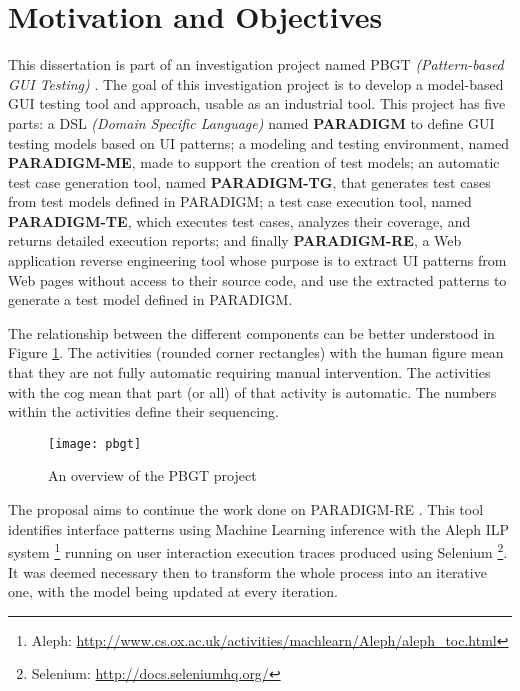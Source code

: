 \section{Motivation and Objectives} \label{sec:goals}

This dissertation is part of an investigation project named PBGT \textit{(Pattern-based GUI Testing)} \cite{moreira2013pattern}. The goal of this investigation project is to develop a model-based GUI testing tool and approach, usable as an industrial tool. This project has five parts: a DSL \textit{(Domain Specific Language)} named \textbf{PARADIGM} to define GUI testing models based on UI patterns; a modeling and testing environment, named \textbf{PARADIGM-ME}, made to support the creation of test models; an automatic test case generation tool, named \textbf{PARADIGM-TG}, that generates test cases from test models defined in PARADIGM; a test case execution tool, named \textbf{PARADIGM-TE}, which executes test cases, analyzes their coverage, and returns detailed execution reports; and finally \textbf{PARADIGM-RE}, a Web application reverse engineering tool whose purpose is to extract UI patterns from Web pages without access to their source code, and use the extracted patterns to generate a test model defined in PARADIGM. 

The relationship between the different components can be better understood in Figure \ref{fig:pbgt}. The activities (rounded corner rectangles) with the human figure mean that they are not fully automatic requiring manual intervention. The activities with the cog mean that part (or all) of that activity is automatic. The numbers within the activities define their sequencing.

\begin{figure}[!htb]
  \begin{center}
    \leavevmode
    \texttt{[image: pbgt]}
  	\caption[An overview of the PBGT project]{An overview of the PBGT project \cite{nabuco2013inferring}}
  	\label{fig:pbgt}
   \end{center}
\end{figure}

The proposal aims to continue the work done on PARADIGM-RE \cite{nabuco2013inferring}. This tool identifies interface patterns using Machine Learning inference with the Aleph ILP system \footnote{Aleph: \url{http://www.cs.ox.ac.uk/activities/machlearn/Aleph/aleph\_toc.html}} running on user interaction execution traces produced using Selenium \footnote{Selenium: \url{http://docs.seleniumhq.org/}}. It was deemed necessary then to transform the whole process into an iterative one, with the model being updated at every iteration. 

